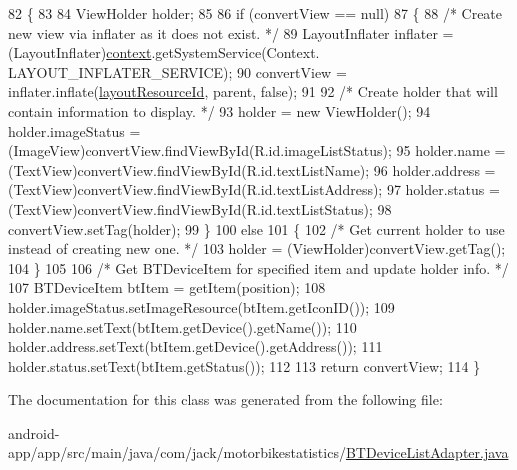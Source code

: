 \begin{DoxyCode}
82                                                                           \{
83 
84         ViewHolder holder;
85 
86         \textcolor{keywordflow}{if} (convertView == null)
87         \{
88             \textcolor{comment}{/* Create new view via inflater as it does not exist. */}
89             LayoutInflater inflater = (LayoutInflater)\hyperlink{class_android_app_1_1_b_t_device_list_adapter_a6ede6626d5bc086d094f35071f8d59c8}{context}.getSystemService(Context.
      LAYOUT\_INFLATER\_SERVICE);
90             convertView = inflater.inflate(\hyperlink{class_android_app_1_1_b_t_device_list_adapter_ae0c8b1482e416a5b242dcec87b83f661}{layoutResourceId}, parent, \textcolor{keyword}{false});
91 
92             \textcolor{comment}{/* Create holder that will contain information to display. */}
93             holder = \textcolor{keyword}{new} ViewHolder();
94             holder.imageStatus = (ImageView)convertView.findViewById(R.id.imageListStatus);
95             holder.name = (TextView)convertView.findViewById(R.id.textListName);
96             holder.address = (TextView)convertView.findViewById(R.id.textListAddress);
97             holder.status = (TextView)convertView.findViewById(R.id.textListStatus);
98             convertView.setTag(holder);
99         \}
100         \textcolor{keywordflow}{else}
101         \{
102             \textcolor{comment}{/* Get current holder to use instead of creating new one. */}
103             holder = (ViewHolder)convertView.getTag();
104         \}
105 
106         \textcolor{comment}{/* Get BTDeviceItem for specified item and update holder info. */}
107         BTDeviceItem btItem = getItem(position);
108         holder.imageStatus.setImageResource(btItem.getIconID());
109         holder.name.setText(btItem.getDevice().getName());
110         holder.address.setText(btItem.getDevice().getAddress());
111         holder.status.setText(btItem.getStatus());
112 
113         \textcolor{keywordflow}{return} convertView;
114     \}
\end{DoxyCode}


The documentation for this class was generated from the following file\+:\begin{DoxyCompactItemize}
\item 
android-\/app/app/src/main/java/com/jack/motorbikestatistics/\hyperlink{_b_t_device_list_adapter_8java}{B\+T\+Device\+List\+Adapter.\+java}\end{DoxyCompactItemize}
